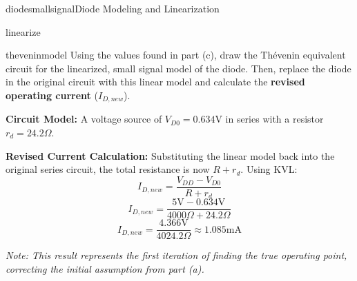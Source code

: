 \begin{mainquestion}{diodesmallsignal}{Diode Modeling and Linearization}
\begin{partquestion}{linearize}
\end{partquestion}

\begin{partquestion}{theveninmodel}
{Using the values found in part (c), draw the Thévenin equivalent circuit for the linearized, small signal model of the diode. Then, replace the diode in the original circuit with this linear model and calculate the \textbf{revised operating current} ($I_{D,new}$).}

\begin{answer}[2in]
        \textbf{Circuit Model:}
        A voltage source of $V_{D0} = 0.634\text{V}$ in series with a resistor $r_d = 24.2\Omega$.
        
        \textbf{Revised Current Calculation:}
        Substituting the linear model back into the original series circuit, the total resistance is now $R + r_d$. Using KVL:
        \[ I_{D,new} = \frac{V_{DD} - V_{D0}}{R + r_d} \]
        \[ I_{D,new} = \frac{5\text{V} - 0.634\text{V}}{4000\Omega + 24.2\Omega} \]
        \[ I_{D,new} = \frac{4.366\text{V}}{4024.2\Omega} \approx 1.085\text{mA} \]
        
        \textit{Note: This result represents the first iteration of finding the true operating point, correcting the initial assumption from part (a).}
\end{answer}

\end{partquestion}

\end{mainquestion}
